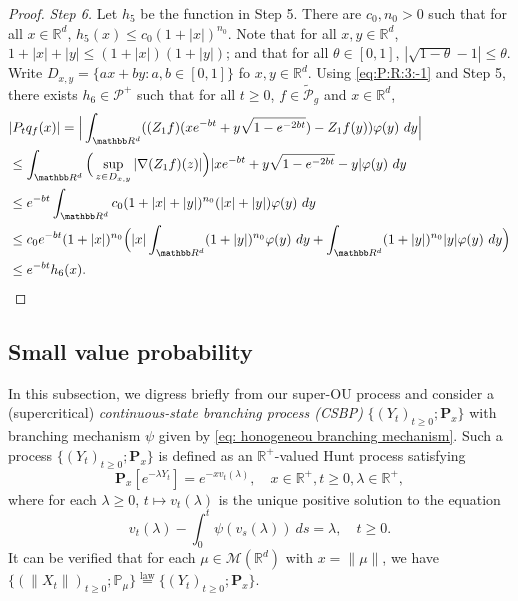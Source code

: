 \documentclass[EJP]{ejpecp} %
\begin{document}
\begin{proof}
	\emph{Step 6.} Let $h_5$ be the function in Step 5.
	There are $c_0, n_0> 0$ such that for all $x\in \mathbb R^d$, $h_5(x) \leq c_0(1+|x|)^{n_0}$.
  	Note that for all $x, y \in \mathbb R^d$, $1+|x|+|y|\leq (1+|x|) (1+|y|)$; and that for all $\theta \in [0,1]$, $|\sqrt {1 - \theta} - 1| \leq \theta$.
  	Write $D_{x,y} = \{ax+by: a, b \in [0,1]\}$ fo $x, y \in \mathbb R^d$.
  	Using \eqref{eq:P:R:3:-1} and Step 5, there exists  $h_6 \in \mathcal P^+$ such that for all $t \geq 0$, $f \in \widetilde {\mathcal P}_g$ and $x \in \mathbb R^d$,
\begin{align}
    & |P_t q_f(x)|
    = \Big| \int_{\mathbb R^d} ( (Z_1f)(x e^{-bt}+ y \sqrt{1 - e^{-2bt}}) - Z_1 f (y) ) \varphi(y) ~dy \Big| \\
    & \leq \int_{\mathbb R^d} \Big(\sup_{z\in D_{x,y}} |\nabla  (Z_1f) (z) |\Big) | x e^{-bt} + y \sqrt{1 - e^{-2bt}} - y | \varphi(y) ~dy \\
    & \leq e^{-bt} \int_{\mathbb R^d} c_0(1+|x|+|y|)^{n_0} (|x|+|y|) \varphi(y) ~dy \\
    & \leq c_0 e^{-bt}(1+|x|)^{n_0}\Big(|x|\int_{\mathbb R^d} (1+|y|)^{n_0}\varphi(y) ~dy + \int_{\mathbb R^d} (1+ |y|)^{n_0} |y| \varphi(y) ~dy \Big) \\
    & \leq e^{-bt} h_6(x).
\qedhere
\end{align}
\end{proof}

\subsection{Small value probability}
\label{sec: Small value probability}
	In this subsection, we digress briefly from our super-OU process and consider a (supercritical) \emph{continuous-state branching process (CSBP)} $\{(Y_t)_{t\geq 0}; \mathbf P_x\}$ with branching mechanism $\psi$ given by \eqref{eq: honogeneou branching mechanism}.
	Such a process $\{(Y_t)_{t\geq 0}; \mathbf P_x\}$ is defined as an $\mathbb R^+$-valued Hunt process satisfying
\[
	\mathbf P_x[e^{-\lambda Y_t}] = e^{- x v_t(\lambda)},
	\quad x\in \mathbb R^+, t\geq 0, \lambda \in \mathbb R^+,
\]
	where for each $\lambda\geq 0$, $t\mapsto v_t(\lambda)$ is the unique positive solution to the equation
\begin{equation}
	\label{eq: fkpp equation for CSBP}
	v_t(\lambda) - \int_0^t \psi(v_s(\lambda))~ds = \lambda,
	\quad t\geq 0.
\end{equation}
	It can be verified that for each $\mu \in \mathcal M(\mathbb R^d)$ with $x = \| \mu \|$, we have $ \{(\|X_t\|)_{t\geq 0}; \mathbb P_\mu\} \overset{\text{law}}{=} \{(Y_t)_{t\geq 0}; \mathbf P_x\}$.
\end{document}

